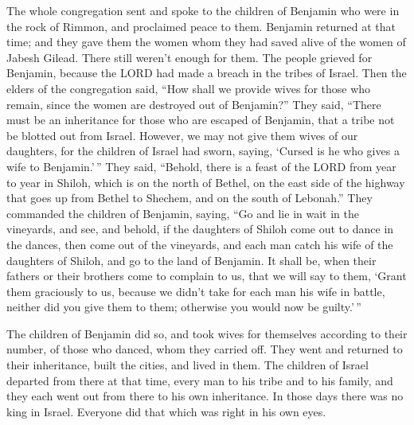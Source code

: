  The whole congregation sent and spoke to the children of
Benjamin who were in the rock of Rimmon, and proclaimed peace to them.
 Benjamin returned at that time; and they gave them the
women whom they had saved alive of the women of Jabesh Gilead. There
still weren't enough for them.  The people grieved for
Benjamin, because the LORD had made a breach in the tribes of Israel.
 Then the elders of the congregation said, ``How shall we
provide wives for those who remain, since the women are destroyed out of
Benjamin?''  They said, ``There must be an inheritance
for those who are escaped of Benjamin, that a tribe not be blotted out
from Israel.  However, we may not give them wives of our
daughters, for the children of Israel had sworn, saying, `Cursed is he
who gives a wife to Benjamin.'\,''  They said, ``Behold,
there is a feast of the LORD from year to year in Shiloh, which is on
the north of Bethel, on the east side of the highway that goes up from
Bethel to Shechem, and on the south of Lebonah.''  They
commanded the children of Benjamin, saying, ``Go and lie in wait in the
vineyards,  and see, and behold, if the daughters of
Shiloh come out to dance in the dances, then come out of the vineyards,
and each man catch his wife of the daughters of Shiloh, and go to the
land of Benjamin.  It shall be, when their fathers or
their brothers come to complain to us, that we will say to them, `Grant
them graciously to us, because we didn't take for each man his wife in
battle, neither did you give them to them; otherwise you would now be
guilty.'\,''

 The children of Benjamin did so, and took wives for
themselves according to their number, of those who danced, whom they
carried off. They went and returned to their inheritance, built the
cities, and lived in them.  The children of Israel
departed from there at that time, every man to his tribe and to his
family, and they each went out from there to his own inheritance.
 In those days there was no king in Israel. Everyone did
that which was right in his own eyes.

